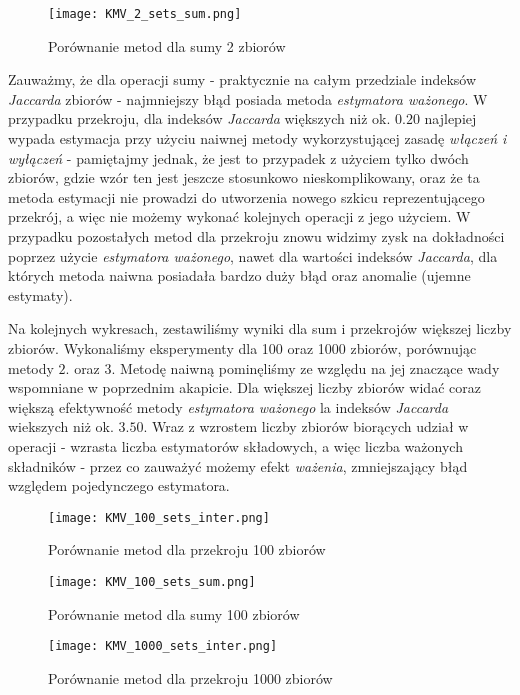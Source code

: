 \begin{figure}[h!]
    \texttt{[image: KMV\_2\_sets\_sum.png]}
    \centering
    \caption{Porównanie metod dla sumy 2 zbiorów}
    \label{fig:KMV_2sets_sum}
\end{figure}

Zauważmy, że dla operacji sumy - praktycznie na całym przedziale indeksów \textit{Jaccarda} zbiorów - najmniejszy błąd posiada metoda \textit{estymatora ważonego}. W przypadku przekroju, dla indeksów \textit{Jaccarda} większych niż ok. $0.20$ najlepiej wypada estymacja przy użyciu naiwnej metody wykorzystującej zasadę \textit{włączeń i wyłączeń} - pamiętajmy jednak, że jest to przypadek z użyciem tylko dwóch zbiorów, gdzie wzór ten jest jeszcze stosunkowo nieskomplikowany, oraz że ta metoda estymacji nie prowadzi do utworzenia nowego szkicu reprezentującego przekrój, a więc nie możemy wykonać kolejnych operacji z jego użyciem. W przypadku pozostałych metod dla przekroju znowu widzimy zysk na dokładności poprzez użycie \textit{estymatora ważonego}, nawet dla wartości indeksów \textit{Jaccarda}, dla których metoda naiwna posiadała bardzo duży błąd oraz anomalie (ujemne estymaty).

Na kolejnych wykresach, zestawiliśmy wyniki dla sum i przekrojów większej liczby zbiorów. Wykonaliśmy eksperymenty dla 100 oraz 1000 zbiorów, porównując metody $2.$ oraz $3.$ Metodę naiwną pominęliśmy ze względu na jej znaczące wady wspomniane w poprzednim akapicie. Dla większej liczby zbiorów widać coraz większą efektywność metody \textit{estymatora ważonego} la indeksów \textit{Jaccarda} wiekszych niż ok. $3.50$. Wraz z wzrostem liczby zbiorów biorących udział w operacji - wzrasta liczba estymatorów składowych, a więc liczba ważonych składników - przez co zauważyć możemy efekt \textit{ważenia}, zmniejszający błąd względem pojedynczego estymatora.

\begin{figure}[h!]
    \texttt{[image: KMV\_100\_sets\_inter.png]}
    \centering
    \caption{Porównanie metod dla przekroju 100 zbiorów}
    \label{fig:KMV_1000sets_inter}
\end{figure}

\begin{figure}[h!]
    \texttt{[image: KMV\_100\_sets\_sum.png]}
    \centering
    \caption{Porównanie metod dla sumy 100 zbiorów}
    \label{fig:KMV_100sets_sum}
\end{figure}

\begin{figure}[h!]
    \texttt{[image: KMV\_1000\_sets\_inter.png]}
    \centering
    \caption{Porównanie metod dla przekroju 1000 zbiorów}
    \label{fig:KMV_100sets_inter}
\end{figure}

